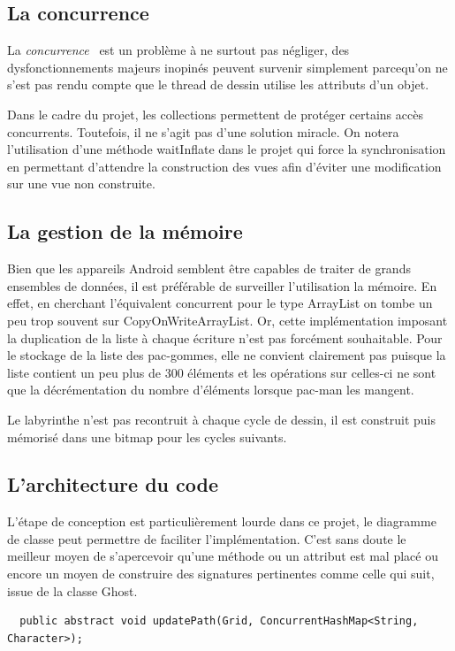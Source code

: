 \documentclass{article}
\begin{document}
\subsection{La concurrence}

La \textit{concurrence}~\cite{concurrence} est un problème à ne surtout pas négliger, des dysfonctionnements majeurs inopinés peuvent survenir simplement parcequ'on ne s'est pas rendu compte que le thread de dessin utilise les attributs d'un objet.

Dans le cadre du projet, les collections permettent de protéger certains accès concurrents. Toutefois, il ne s'agit pas d'une solution miracle. On notera l'utilisation d'une méthode waitInflate dans le projet qui force la synchronisation en permettant d'attendre la construction des vues afin d'éviter une modification sur une vue non construite.

\subsection{La gestion de la mémoire}

Bien que les appareils Android semblent être capables de traiter de grands ensembles de données, il est préférable de surveiller l’utilisation la mémoire. En effet, en cherchant l’équivalent concurrent pour le type ArrayList on tombe un peu trop souvent sur CopyOnWriteArrayList.
Or, cette implémentation imposant la duplication de la liste à chaque écriture n’est pas forcément souhaitable. Pour le stockage de la liste des pac-gommes, elle ne convient clairement pas puisque la liste contient un peu plus de 300 éléments et les opérations sur celles-ci ne sont que la décrémentation du nombre d'éléments lorsque pac-man les mangent.

Le labyrinthe n'est pas recontruit à chaque cycle de dessin, il est construit puis mémorisé dans une bitmap pour les cycles suivants.

\subsection{L’architecture du code}

L’étape de conception est particulièrement lourde dans ce projet, le diagramme de classe peut permettre de faciliter l’implémentation. C'est sans doute le meilleur moyen de s'apercevoir qu'une méthode ou un attribut est mal placé ou encore un moyen de construire des signatures pertinentes comme celle qui suit, issue de la classe Ghost.
\begin{verbatim}
  public abstract void updatePath(Grid, ConcurrentHashMap<String, Character>);
\end{verbatim}
\end{document}
